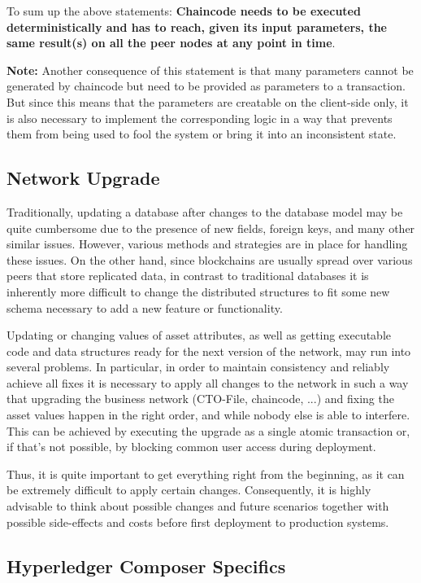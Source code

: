 To sum up the above statements: \textbf{Chaincode needs to be executed deterministically and has to reach, given its input parameters, the same result(s) on all the peer nodes at any point in time}.

\textbf{Note:} Another consequence of this statement is that many parameters cannot be generated by chaincode but need to be provided as parameters to a transaction. But since this means that the parameters are creatable on the client-side only, it is also necessary to implement the corresponding logic in a way that prevents them from being used to fool the system or bring it into an inconsistent state.

\subsection{Network Upgrade}

Traditionally, updating a database after changes to the database model may be quite cumbersome due to the presence of new fields, foreign keys, and many other similar issues. However, various methods and strategies are in place for handling these issues.
On the other hand, since blockchains are usually spread over various peers that store replicated data, in contrast to traditional databases it is inherently more difficult to change the distributed structures to fit some new schema necessary to add a new feature or functionality.

Updating or changing values of asset attributes, as well as getting executable code and data structures ready for the next version of the network, may run into several problems. In particular, in order to maintain consistency and reliably achieve all fixes it is necessary to apply all changes to the network in such a way that upgrading the business network (CTO-File, chaincode, ...) and fixing the asset values happen in the right order, and while nobody else is able to interfere. This can be achieved by executing the upgrade as a single atomic transaction or, if that's not possible, by blocking common user access during deployment.

Thus, it is quite important to get everything right from the beginning, as it can be extremely difficult to apply certain changes. Consequently, it is highly advisable to think about possible changes and future scenarios together with possible side-effects and costs before first deployment to production systems.

\subsection{Hyperledger Composer Specifics}

